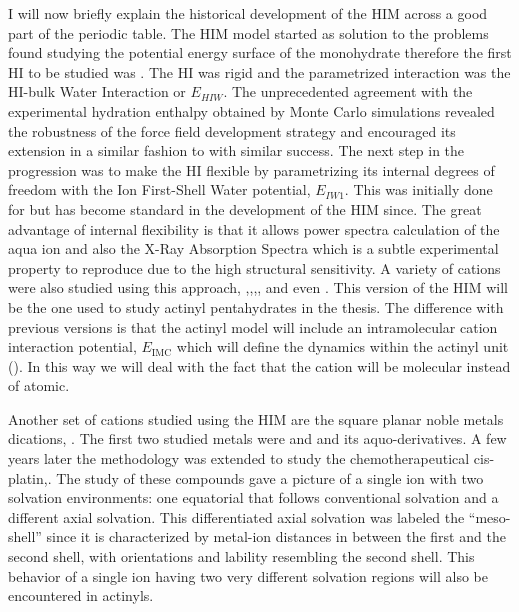 I will now briefly explain the historical development of the HIM across a good part of the periodic 
table. The HIM model started as solution to the problems found studying the potential energy 
surface of the  monohydrate\cite{JPhysChem_ESM_1992} therefore the first HI to be 
studied was .\cite{JPhysChem_ESM_1993} The HI was rigid and the parametrized 
interaction was the HI-bulk Water Interaction or $E_{HIW}$. The unprecedented  
agreement with the experimental hydration enthalpy obtained by Monte Carlo simulations  
revealed the robustness of the force field development strategy and encouraged its extension in 
a similar fashion to   with similar 
success\cite{JPhysChem_ESM_1996,JPhysChemB_ESM_1998}. The next 
step in the 
progression was to make the HI flexible by parametrizing its internal degrees of freedom with the 
Ion First-Shell Water potential, $E_{IW1}$. This was initially done for  but 
has become standard in the development of the HIM since.\cite{JChemPhys_ESM_1998} The great 
advantage of internal flexibility is that it allows power spectra calculation of the 
aqua ion and 
also the X-Ray Absorption Spectra which is a subtle experimental property to 
reproduce due to the high structural 
sensitivity\cite{Angew_ESM_2010,Merkling2001,JACS_ESM_2002,caralimpio2018looking,thesisNoe}. A 
variety of cations were also studied using this approach, 
,,,, 
 and even .\cite{Martinez2004,JPhysChemB_ESM_2007,JACS_ESM_1999,Yang2001} 
This 
version of the HIM will be 
the one used to study actinyl pentahydrates in the thesis. The difference with previous versions is 
that the actinyl model will include an intramolecular cation interaction potential, 
$E_\text{IMC}$ which 
will define the dynamics within the actinyl unit (). In this way we will deal with 
the fact that the cation will be molecular instead of atomic. 

Another set of cations studied using the HIM are the square planar noble metals dications, 
. The first two studied metals were  and 
 and its aquo-derivatives\cite{JPhysChemB_ESM_2004,Torrico2006}. A few 
years later the methodology was 
extended to study the chemotherapeutical 
cis-platin,\newline{}.\cite{JChemTheoComp_ESM_2013,Melchior2015} The 
study of these 
compounds gave 
a picture of a single ion with two solvation environments: one equatorial that follows conventional 
solvation and a different axial solvation. This differentiated axial solvation was 
labeled the ``meso-shell'' since it is characterized by metal-ion distances in between the first 
and the second
shell, with orientations and lability resembling the second shell. This behavior 
of a single ion having two very different solvation regions will also be encountered in 
actinyls.

